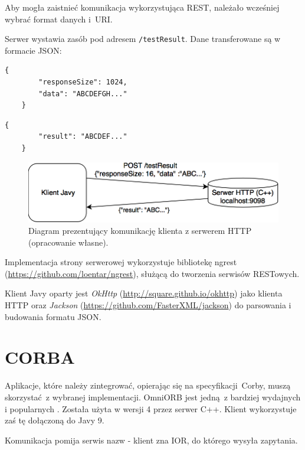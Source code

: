 \label{REST_impl}
Aby mogła zaistnieć komunikacja wykorzystująca REST, należało wcześniej wybrać format danych i~URI.

Serwer wystawia zasób pod adresem \texttt{/testResult}. Dane transferowane są w formacie JSON:
\begin{lstlisting}[caption={Format danych wysyłany przez klienta.},captionpos=b]
    {
        "responseSize": 1024,
        "data": "ABCDEFGH..."
    }
\end{lstlisting}

\begin{lstlisting}[caption={Format danych zwracany przez serwer.},captionpos=b]
    {
        "result": "ABCDEF..."
    }
\end{lstlisting}

\begin{figure}[h!]
    \centering
    \includegraphics[width=\textwidth,height=\textheight,keepaspectratio]{img/rest_impl_diagram.png}
    \caption{Diagram prezentujący komunikację klienta z serwerem HTTP (opracowanie własne).}
\end{figure}

Implementacja strony serwerowej wykorzystuje bibliotekę ngrest (\url{https://github.com/loentar/ngrest}), służącą do tworzenia serwisów RESTowych.

Klient Javy oparty jest \textit{OkHttp} (\url{http://square.github.io/okhttp}) jako klienta HTTP oraz \textit{Jackson} \newline (\url{https://github.com/FasterXML/jackson}) do parsowania i budowania formatu JSON.


\section{CORBA}

Aplikacje, które należy zintegrować, opierając się na specyfikacji Corby, muszą skorzystać z wybranej implementacji. OmniORB jest jedną z bardziej wydajnych i popularnych \cite{omniORB}. Została użyta w wersji 4 przez serwer C++. Klient wykorzystuje zaś tę dołączoną do Javy 9.

Komunikacja pomija serwis nazw - klient zna IOR, do którego wysyła zapytania.

